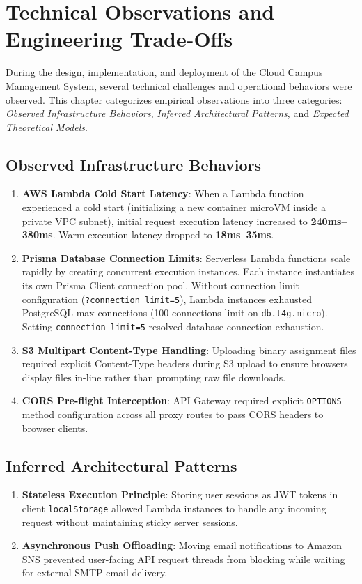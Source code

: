 \chapter{Technical Observations and Engineering Trade-Offs}
\label{chap:observations}

During the design, implementation, and deployment of the Cloud Campus Management System, several technical challenges and operational behaviors were observed. This chapter categorizes empirical observations into three categories: \textit{Observed Infrastructure Behaviors}, \textit{Inferred Architectural Patterns}, and \textit{Expected Theoretical Models}.

\section{Observed Infrastructure Behaviors}
\begin{enumerate}
    \item \textbf{AWS Lambda Cold Start Latency}: When a Lambda function experienced a cold start (initializing a new container microVM inside a private VPC subnet), initial request execution latency increased to \textbf{240ms–380ms}. Warm execution latency dropped to \textbf{18ms–35ms}.
    \item \textbf{Prisma Database Connection Limits}: Serverless Lambda functions scale rapidly by creating concurrent execution instances. Each instance instantiates its own Prisma Client connection pool. Without connection limit configuration (\texttt{?connection\_limit=5}), Lambda instances exhausted PostgreSQL max connections (100 connections limit on \texttt{db.t4g.micro}). Setting \texttt{connection\_limit=5} resolved database connection exhaustion.
    \item \textbf{S3 Multipart Content-Type Handling}: Uploading binary assignment files required explicit Content-Type headers during S3 upload to ensure browsers display files in-line rather than prompting raw file downloads.
    \item \textbf{CORS Pre-flight Interception}: API Gateway required explicit \texttt{OPTIONS} method configuration across all proxy routes to pass CORS headers to browser clients.
\end{enumerate}

\section{Inferred Architectural Patterns}
\begin{enumerate}
    \item \textbf{Stateless Execution Principle}: Storing user sessions as JWT tokens in client \texttt{localStorage} allowed Lambda instances to handle any incoming request without maintaining sticky server sessions.
    \item \textbf{Asynchronous Push Offloading}: Moving email notifications to Amazon SNS prevented user-facing API request threads from blocking while waiting for external SMTP email delivery.
\end{enumerate}

